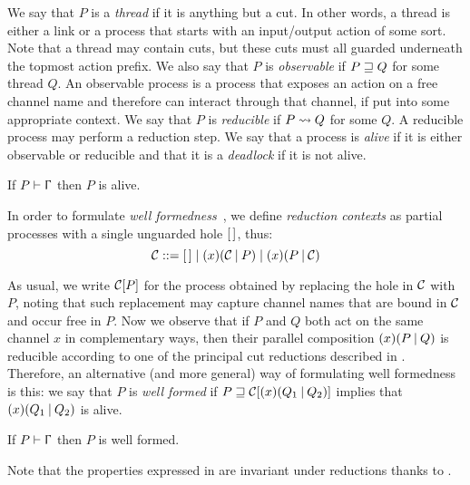 We say that $P$ is a \emph{thread} if it is anything but a cut. In other words,
a thread is either a link or a process that starts with an input/output action
of some sort. Note that a thread may contain cuts, but these cuts must all
guarded underneath the topmost action prefix.
%
We also say that $P$ is \emph{observable} if $P \sqsupseteq Q$ for some thread $Q$.
An observable process is a process that exposes an action on a free channel name
and therefore can interact through that channel, if put into some appropriate
context. We say that $P$ is \emph{reducible} if $P \leadsto Q$ for some $Q$. A
reducible process may perform a reduction step.
%
We say that a process is \emph{alive} if it is either observable or reducible
and that it is a \emph{deadlock} if it is not alive.

\begin{theorem}
    \label{thm:df}
    If $\wtp{P}\Context$ then $P$ is alive.
\end{theorem}

In order to formulate \emph{well formedness}~\cite{CarboneEtAl24}, we define
\emph{reduction contexts} as partial processes with a single unguarded hole
$[\,]$, thus:
\[
    \mathcal{C} ::= [\,] \mid (x)(\mathcal{C}\mathbin| P) \mid (x)(P\mathbin|\mathcal{C})
\]

As usual, we write $\mathcal{C}[P]$ for the process obtained by replacing
the hole in $\mathcal{C}$ with $P$, noting that such replacement may
capture channel names that are bound in $\mathcal{C}$ and occur free in
$P$.
%
Now we observe that if $P$ and $Q$ both act on the same channel $x$ in
complementary ways, then their parallel composition $(x)(P\mathbin| Q)$ is reducible
according to one of the principal cut reductions described in
. Therefore, an alternative (and more general) way of
formulating well formedness is this:
%
we say that $P$ is \emph{well formed} if $P \sqsupseteq
\mathcal{C}[(x)(Q_1\mathbin| Q_2)]$ implies that $(x)(Q_1\mathbin| Q_2)$ is alive.

\begin{theorem}
    \label{thm:type-safety}
    If $\wtp{P}\Context$ then $P$ is well formed.
\end{theorem}

Note that the properties expressed in  are
invariant under reductions thanks to .
